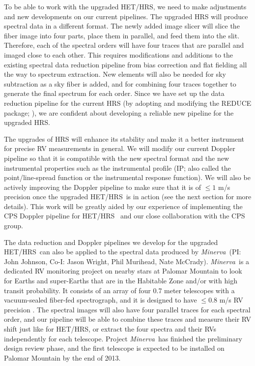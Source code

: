 \documentclass[12pt]{article}
\def\leq{\leqslant}
\def\minerva{{\it Minerva}}
\def\hrs{HET/HRS}
\begin{document}
To be able to work with the upgraded \hrs, we need to make adjustments
and new developments on our current pipelines. The upgraded HRS will
produce spectral data in a different format. The newly added image
slicer will slice the fiber image into four parts, place them in
parallel, and feed them into the slit. Therefore, each of the spectral
orders will have four traces that are parallel and imaged close to
each other. This requires modifications and additions to the existing
spectral data reduction pipeline from bias correction and flat
fielding all the way to spectrum extraction. New elements will also be
needed for sky subtraction as a sky fiber is added, and
for combining four traces together to generate the final spectrum for
each order. Since we have set up the data reduction pipeline for the
current HRS (by adopting and modifying the REDUCE package;
\citealt{reduce2002}), we are confident about developing a
reliable new pipeline for the upgraded HRS.

The upgrades of HRS will enhance its stability and
make it a better instrument for precise RV measurements in general. We
will modify our current Doppler pipeline so that it is
compatible with the new spectral format and the new instrumental
properties such as the instrumental profile (IP; also called the
point/line-spread function or the instrumental response function).
We will also be actively improving the Doppler pipeline to make sure
that it is of $\leq 1$ m/s precision once the upgraded \hrs\ is in
action (see the next section for more details). This work will be
greatly aided by our experience of implementing the CPS Doppler
pipeline for \hrs\ \citep{johnson2011,wang2012} and our close
collaboration with the CPS group.

The data reduction and Doppler pipelines we develop for the upgraded
\hrs\ can also be applied to the spectral data produced by
\minerva\ (PI: John Johnson, Co-I: Jason Wright, Phil Murihead, Nate
McCrady). \minerva\ is a dedicated RV monitoring project on nearby
stars at Palomar Mountain to look for Earths and super-Earths that are
in the Habitable Zone and/or with high transit probability. It
consists of an array of four 0.7 meter telescopes with a vacuum-sealed
fiber-fed spectrograph, and it is designed to have $\leq 0.8$ m/s RV
precision \citep{bottom2013}. The spectral images will also have four
parallel traces for each spectral order, and our pipeline will be able
to combine these traces and measure their RV shift just like for \hrs,
or extract the four spectra and their RVs independently for each
telescope. Project \minerva\ has finished the preliminary design
review phase, and the first telescope is expected to be installed on
Palomar Mountain by the end of 2013.
\end{document}

